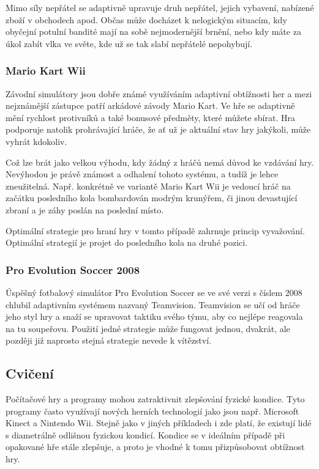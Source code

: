 Mimo síly nepřátel se adaptivně upravuje druh nepřátel, jejich vybavení, nabízené zboží v obchodech apod. Občas může docházet k nelogickým situacím, kdy obyčejní potulní bandité mají na sobě nejmodernější brnění, nebo kdy máte za úkol zabít vlka ve světe, kde už se tak slabí nepřátelé nepohybují\cite{4}. 

\subsubsection{Mario Kart Wii}

Závodní simulátory jsou dobře známé využíváním adaptivní obtížnosti her a mezi nejznámější zástupce patří arkádové závody Mario Kart. Ve hře se adaptivně mění rychlost protivníků a také bonusové předměty, které můžete sbírat. Hra podporuje natolik prohrávající hráče, že ať už je aktuální stav hry jakýkoli, může vyhrát kdokoliv.

Což lze brát jako velkou výhodu, kdy žádný z hráčů nemá důvod ke vzdávání hry. Nevýhodou je právě známost a odhalení tohoto systému, a tudíž je lehce zneužitelná. Např. konkrétně ve variantě Mario Kart Wii je vedoucí hráč na začátku posledního kola bombardován modrým krunýřem, či jinou devastující zbraní a je záhy poslán na poslední místo. 

Optimální strategie pro hraní hry v tomto případě zahrnuje princip vyvažování. Optimální strategií je projet do posledního kola na druhé pozici\cite{5}. 

\subsubsection{Pro Evolution Soccer 2008}

Úspěšný fotbalový simulátor Pro Evolution Soccer se ve své verzi s číslem 2008 chlubil adaptivním systémem nazvaný Teamvision. Teamvision se učí od hráče jeho styl hry a snaží se upravovat taktiku svého týmu, aby co nejlépe reagovala na tu soupeřovu. Použití jedné strategie může fungovat jednou, dvakrát, ale později již naprosto stejná strategie nevede k vítězství\cite{6}. 

\subsection{Cvičení}

Počítačové hry a programy mohou zatraktivnit zlepšování fyzické kondice. Tyto programy často využívají nových herních technologií jako jsou např. Microsoft Kinect\cite{kinect} a Nintendo Wii\cite{wii}. Stejně jako v jiných příkladech i zde platí, že existují lidé s diametrálně odlišnou fyzickou kondicí. Kondice se v ideálním případě při opakované hře stále zlepšuje, a proto je vhodné k tomu přizpůsobovat obtížnost hry.

